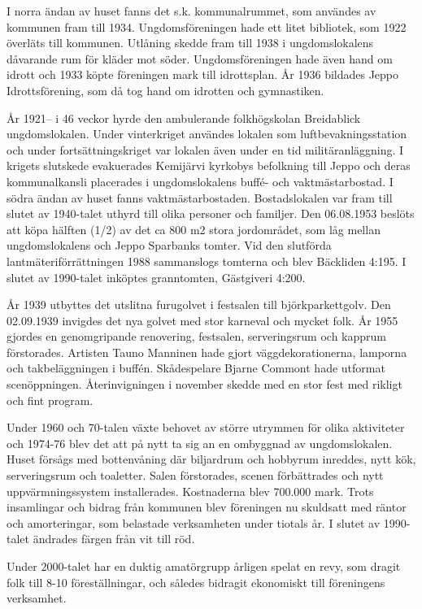 I norra ändan av huset fanns det s.k. kommunalrummet, som användes av kommunen fram till 1934. Ungdomsföreningen hade ett litet bibliotek, som 1922 överläts till kommunen. Utlåning skedde fram till 1938 i ungdomslokalens dåvarande rum för kläder mot söder. Ungdomsföreningen hade även hand om idrott och 1933 köpte föreningen mark till idrottsplan. År 1936 bildades Jeppo Idrottsförening, som då tog hand om idrotten och gymnastiken.

År 1921-- i 46 veckor hyrde den ambulerande folkhögskolan Breidablick ungdomslokalen. Under vinterkriget användes lokalen som luftbevakningsstation och under fortsättningskriget var lokalen även under en tid militäranläggning. I krigets slutskede evakuerades Kemijärvi kyrkobys befolkning till Jeppo och deras kommunalkansli placerades i ungdomslokalens buffé- och vaktmästarbostad. I södra ändan av huset fanns vaktmästarbostaden. Bostadslokalen var fram till slutet av 1940-talet uthyrd till olika personer och familjer.
Den 06.08.1953 beslöts att köpa hälften (1/2) av det ca 800 m2 stora jordområdet, som låg mellan ungdomslokalens och Jeppo Sparbanks tomter. Vid den slutförda lantmäteriförrättningen 1988 sammanslogs tomterna och blev Bäckliden 4:195. I slutet av 1990-talet inköptes granntomten, Gästgiveri 4:200.

År 1939 utbyttes det utslitna furugolvet i festsalen till björkparkettgolv. Den 02.09.1939 invigdes det nya golvet med stor karneval och mycket folk. År 1955 gjordes en genomgripande renovering, festsalen, serveringsrum och kapprum förstorades. Artisten Tauno Manninen hade gjort väggdekorationerna, lamporna och takbeläggningen i buffén. Skådespelare Bjarne Commont hade utformat scenöppningen. Återinvigningen i november skedde med en stor fest med rikligt och fint program.

Under 1960 och 70-talen växte behovet av större utrymmen för olika aktiviteter och 1974-76 blev det att på nytt ta sig an en ombyggnad av ungdomslokalen. Huset försågs med bottenvåning där biljardrum och hobbyrum inreddes, nytt kök, serveringsrum och toaletter. Salen förstorades, scenen förbättrades och nytt uppvärmningssystem installerades. Kostnaderna blev 700.000 mark. Trots insamlingar och bidrag från kommunen blev föreningen nu skuldsatt med räntor och amorteringar, som belastade verksamheten under tiotals år. I slutet av 1990-talet ändrades färgen från vit till röd.

Under 2000-talet har en duktig amatörgrupp årligen spelat en revy, som dragit folk till 8-10 föreställningar, och således bidragit ekonomiskt till föreningens verksamhet.

